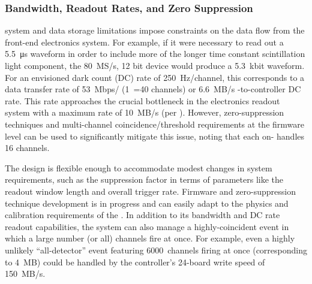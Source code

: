 
 
\subsubsection{Bandwidth, Readout Rates, and Zero Suppression}

 system and data storage limitations impose constraints on the  data flow from the front-end electronics system. 
For example, if it were necessary to read out a \SI{5.5}{\micro\second} waveform in order to include more of the longer time constant scintillation light component, the \SI{80}{MS/s}, 12 bit  device would produce a 5.3~kbit waveform. For an envisioned dark count (DC) rate of 250~Hz/channel, this corresponds to a data transfer rate of 53~Mbps/ (1~=40 channels) or 6.6~MB/s -to-controller DC rate. This rate approaches the crucial bottleneck in the electronics readout system with a maximum rate of 10~MB/s  %
(per ). However, zero-suppression techniques and multi-channel coincidence/threshold requirements at the  firmware level can be used to significantly mitigate this issue, noting that each on-  handles 16 channels. 

The design is flexible enough to accommodate modest changes in system requirements, such as the suppression factor in terms of parameters like the readout window length and overall trigger rate. 
Firmware and zero-suppression technique development is in progress and can easily adapt to the physics and calibration requirements of the .
In addition to its bandwidth and DC rate readout capabilities, the system can also  manage a highly-coincident event in which a large number (or all) channels fire at once. For example, even a highly unlikely ``all-detector'' event featuring 6000~channels firing at once (corresponding to 4~MB) could be handled by the controller's 24-board write speed of 150~MB/s. 

